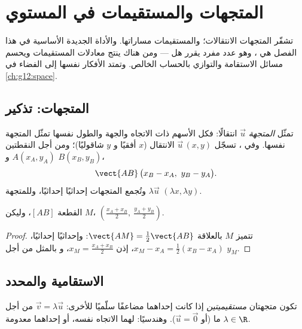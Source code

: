 \chapter{المتجهات والمستقيمات في المستوي}\label{ch:g11:vect}

تشفّر المتجهات الانتقالات؛ والمستقيمات مساراتها. والأداة الجديدة
الأساسية في هذا الفصل هي \emph{}، وهو عدد مفرد
يقرر هل  --- ومن هناك ينتج
معادلات المستقيمات ويحسم مسائل الاستقامة والتوازي بالحساب
الخالص. وتمتد الأفكار نفسها إلى الفضاء في \cref{ch:g12:space}.

\section{المتجهات: تذكير}

\begin{definition}\label{def:g11:vect:vector}
تمثّل \emph{المتجهة} $\vec u$ انتقالًا: فكل
الأسهم ذات الاتجاه والجهة والطول نفسها تمثّل المتجهة
نفسها. وفي ، تسجّل $\vec u\,(x, y)$ الانتقال
($x$ أفقيًا و $y$ شاقوليًا)؛ ومن أجل النقطتين $A(x_A, y_A)$ و
$B(x_B, y_B)$،
\[
\vect{AB}\,\bigl(x_B - x_A,\ y_B - y_A\bigr).
\]
وتُجمع المتجهات إحداثيًا إحداثيًا، وللمتجهة $\lambda\vec u$ 
$(\lambda x, \lambda y)$.
\end{definition}

\begin{proposition}[المنتصف]\label{prop:g11:vect:midpoint}
 القطعة $[AB]$، وليكن $M$، 
$\left(\frac{x_A + x_B}{2},\ \frac{y_A + y_B}{2}\right)$.
\end{proposition}

\begin{proof}
تتميز $M$ بالعلاقة $\vect{AM} = \frac12\vect{AB}$: وإحداثيًا إحداثيًا،
$x_M - x_A = \frac12(x_B - x_A)$، إذن $x_M = \frac{x_A + x_B}{2}$، و
بالمثل من أجل $y_M$.
\end{proof}

\section{الاستقامية والمحدد}

\begin{definition}\label{def:g11:vect:collinear}
تكون متجهتان \emph{مستقيميتين} إذا كانت إحداهما
مضاعفًا سلّميًا للأخرى: $\vec v = \lambda \vec u$ من أجل
$\lambda \in \R$ ما (أو $\vec u = \vec 0$). وهندسيًا: لهما الاتجاه
نفسه، أو إحداهما معدومة.
\end{definition}

